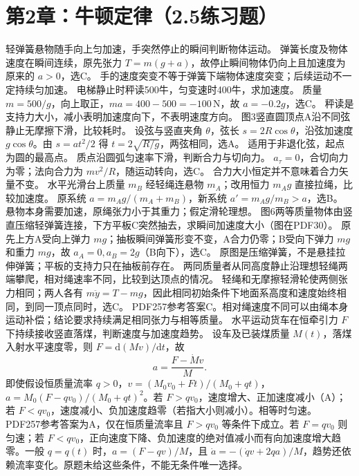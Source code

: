 \section{第2章：牛顿定律（2.5练习题）}
\problemtext 轻弹簧悬物随手向上匀加速，手突然停止的瞬间判断物体运动。
\workings 弹簧长度及物体速度在瞬间连续，原先张力 $T=m(g+a)$，故停止瞬间物体仍向上且加速度为原来的 $a>0$，选C。
\crosscheck 手的速度突变不等于弹簧下端物体速度突变；后续运动不一定持续匀加速。
\problemtext 电梯静止时秤读500牛，匀变速时400牛，求加速度。
\workings 质量 $m=500/g$，向上取正，$ma=400-500=-100\,\mathrm N$，故 $a=-0.2g$，选C。
\crosscheck 秤读是支持力大小，减小表明加速度向下，不表明速度方向。
\problemtext 图3竖直圆顶点A沿不同弦静止无摩擦下滑，比较耗时。
\workings 设弦与竖直夹角 $\theta$，弦长 $s=2R\cos\theta$，沿弦加速度 $g\cos\theta$。由 $s=at^2/2$ 得 $t=2\sqrt{R/g}$，两弦相同，选A。
\crosscheck 适用于非退化弦，起点为圆的最高点。
\problemtext 质点沿圆弧匀速率下滑，判断合力与切向力。
\workings $a_\tau=0$，合切向力为零；法向合力为 $mv^2/R$，随运动转向，选C。
\crosscheck 合力大小恒定并不意味着合力矢量不变。
\problemtext 水平光滑台上质量 $m_B$ 经轻绳连悬物 $m_A$；改用恒力 $m_Ag$ 直接拉绳，比较加速度。
\workings 原系统 $a=m_Ag/(m_A+m_B)$，新系统 $a'=m_Ag/m_B>a$，选B。
\crosscheck 悬物本身需要加速，原绳张力小于其重力；假定滑轮理想。
\problemtext 图6两等质量物体由竖直压缩轻弹簧连接，下方平板C突然抽去，求瞬间加速度大小（图在PDF30）。
\workings 原先上方A受向上弹力 $mg$；抽板瞬间弹簧形变不变，A合力仍零；B受向下弹力 $mg$ 和重力 $mg$，故 $a_A=0,a_B=2g$（B向下），选C。
\crosscheck 原图是压缩弹簧，不是悬挂拉伸弹簧；平板的支持力只在抽板前存在。
\problemtext 两同质量者从同高度静止沿理想轻绳两端攀爬，相对绳速率不同，比较到达顶点的情况。
\workings 轻绳和无摩擦轻滑轮使两侧张力相同；两人各有 $m\ddot y=T-mg$，因此相同初始条件下地面系高度和速度始终相同，到同一顶点同时，选C。
\crosscheck PDF257参考答案C。相对绳速度不同可以由绳本身运动补偿；结论要求持续满足相同张力与相等质量。
\problemtext 水平运动货车在恒牵引力 $F$ 下持续接收竖直落煤，判断速度与加速度趋势。
\workings 设车及已装煤质量 $M(t)$，落煤入射水平速度零，则 $F=\mathrm d(Mv)/\mathrm dt$，故
\[
a=\frac{F-\dot Mv}{M}.
\]
即使假设恒质量流率 $q>0$，$v=(M_0v_0+Ft)/(M_0+qt)$，$a=M_0(F-qv_0)/(M_0+qt)^2$。若 $F>qv_0$，速度增大、正加速度减小（A）；若 $F<qv_0$，速度减小、负加速度趋零（若指大小则减小）。相等时匀速。
\crosscheck PDF257参考答案为A，仅在恒质量流率且 $F>qv_0$ 等条件下成立。若 $F=qv_0$ 则匀速；若 $F<qv_0$，正向速度下降、负加速度的绝对值减小而有向加速度增大趋零。一般 $q=q(t)$ 时，$a=(F-qv)/M$，且 $\dot a=-(\dot qv+2qa)/M$，趋势还依赖流率变化。原题未给这些条件，不能无条件唯一选择。
